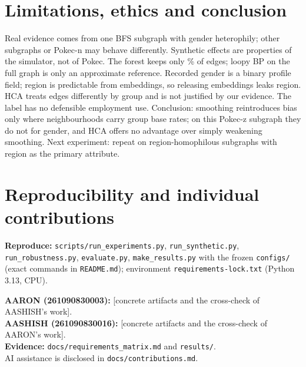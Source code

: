 \documentclass[11pt,a4paper]{article}
\begin{document}
\section{Limitations, ethics and conclusion}
Real evidence comes from one BFS subgraph with gender heterophily; other subgraphs or Pokec-n may behave differently. Synthetic effects are properties of the simulator, not of Pokec. The forest keeps only \RForestKept\% of edges; loopy BP on the full graph is only an approximate reference. Recorded gender is a binary profile field; region is predictable from embeddings, so releasing embeddings leaks region. HCA treats edges differently by group and is not justified by our evidence. The label has no defensible employment use. Conclusion: smoothing reintroduces bias only where neighbourhoods carry group base rates; on this Pokec-z subgraph they do not for gender, and HCA offers no advantage over simply weakening smoothing. Next experiment: repeat on region-homophilous subgraphs with region as the primary attribute.

\section*{Reproducibility and individual contributions}
\begin{sloppypar}\noindent\textbf{Reproduce:} \texttt{scripts/run\_experiments.py}, \texttt{run\_synthetic.py}, \texttt{run\_robustness.py}, \texttt{evaluate.py}, \texttt{make\_results.py} with the frozen \texttt{configs/} (exact commands in \texttt{README.md}); environment \texttt{requirements-lock.txt} (Python 3.13, CPU).\end{sloppypar}
\textbf{AARON (261090830003):} [concrete artifacts and the cross-check of AASHISH's work].\\
\textbf{AASHISH (261090830016):} [concrete artifacts and the cross-check of AARON's work].\\
\textbf{Evidence:} \texttt{docs/requirements\_matrix.md} and \texttt{results/}.\\ AI assistance is disclosed in \texttt{docs/contributions.md}.
\end{document}

